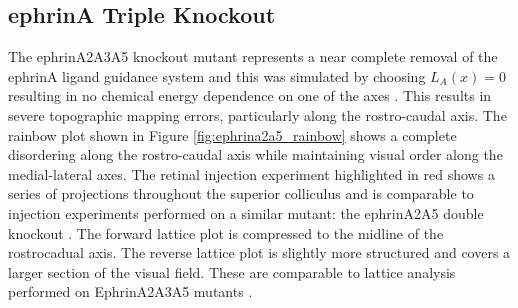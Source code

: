 \subsection{ephrinA Triple Knockout}
The ephrinA2A3A5 knockout mutant represents a near complete removal of the ephrinA ligand guidance system and this was simulated by choosing $L_A(x) = 0$ resulting in no chemical energy dependence on one of the axes \cite{Cang2013-dw}. This results in severe topographic mapping errors, particularly along the rostro-caudal axis. The rainbow plot shown in Figure \ref{fig:ephrina2a5_rainbow} shows a complete disordering along the rostro-caudal axis while maintaining visual order along the medial-lateral axes. The retinal injection experiment highlighted in red shows a series of projections throughout the superior colliculus and is comparable to injection experiments performed on a similar mutant: the ephrinA2A5 double knockout \cite{Feldheim2000-be}. The forward lattice plot is compressed to the midline of the rostrocadual axis. The reverse lattice plot is slightly more structured and covers a larger section of the visual field. These are comparable to lattice analysis performed on EphrinA2A3A5 mutants \cite{Willshaw2014-ms}.
